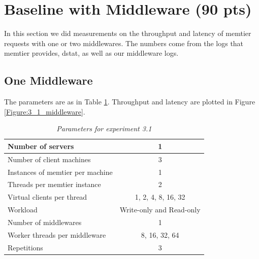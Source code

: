 \documentclass[11pt,a4paper]{article}
\begin{document}
\section{Baseline with Middleware (90 pts)}

In this section we did measurements on the throughput and latency of memtier requests with one or two middlewares. The numbers come from the logs that memtier provides, dstat, as well as our middleware logs.

\subsection{One Middleware}

The parameters are as in Table \ref{Table:3_1_table}. Throughput and latency are plotted in Figure \ref{Figure:3_1_middleware}. 

	\begin{table}[H]
	\centering
		\begin{tabular}{|l|c|}
			\hline Number of servers                					& 1                        \\ 
			\hline Number of client machines        			& 3                        \\ 
			\hline Instances of memtier per machine 		& 1                        \\ 
			\hline Threads per memtier instance     			& 2                        \\
			\hline Virtual clients per thread       				& 1, 2, 4, 8, 16, 32                  \\ 
			\hline Workload                         						& Write-only and Read-only \\
			\hline Number of middlewares            			& 1                        \\
			\hline Worker threads per middleware    		& 8, 16, 32, 64                  \\
			\hline Repetitions                      						& 3           \\ 
			\hline 
		\end{tabular}
		\caption{\textit{Parameters for experiment 3.1}}
		\label{Table:3_1_table}
	\end{table}


\end{document}

